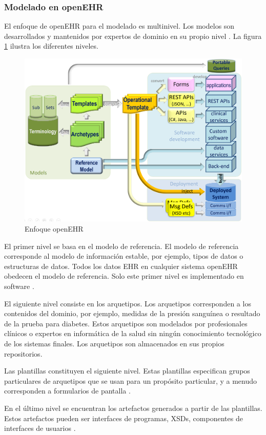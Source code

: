 \subsubsection{Modelado en openEHR}

El enfoque de openEHR para el modelado es multinivel. Los modelos son desarrollados y mantenidos por expertos de dominio en su propio nivel \cite{openEHRArchitecture}. La figura \ref{fig:openeEHR_ecosystem} ilustra los diferentes niveles.

\begin{figure}[h]
  \centering
  \includegraphics[scale=0.6]{./images/openehr_dev_ecosystem}
  \caption{Enfoque openEHR}
  \label{fig:openeEHR_ecosystem}
\end{figure}

El primer nivel se basa en el modelo de referencia. El modelo de referencia corresponde al modelo de información estable, por ejemplo, tipos de datos o estructuras de datos. Todos los datos EHR en cualquier sistema openEHR obedecen el modelo de referencia. Solo este primer nivel es implementado en software \cite{openEHRArchitecture}.

El siguiente nivel consiste en los arquetipos. Los arquetipos corresponden a los contenidos del dominio, por ejemplo, medidas de la presión sanguínea o resultado de la prueba para diabetes. Estos arquetipos son modelados por profesionales clínicos o expertos en informática de la salud sin ningún conocimiento tecnológico de los sistemas finales. Los arquetipos son almacenados en sus propios repositorios.

Las plantillas constituyen el siguiente nivel. Estas plantillas especifican grupos particulares de arquetipos que se usan para un propósito particular, y a menudo corresponden a formularios de pantalla \cite{openEHRArchitecture}.

En el último nivel se encuentran los artefactos generados a partir de las plantillas. Estos artefactos pueden ser interfaces de programas, XSDs, componentes de interfaces de usuarios \cite{openEHR}.
